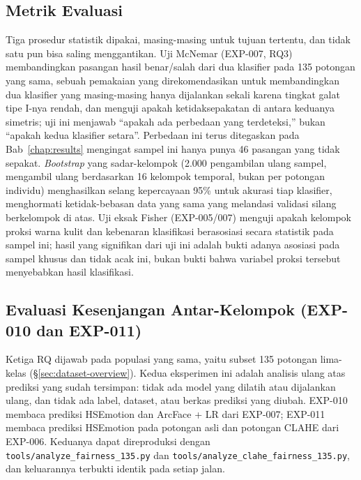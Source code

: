 \subsection{Metrik Evaluasi}
\label{sec:metrics}

Tiga prosedur statistik dipakai, masing-masing untuk tujuan tertentu, dan tidak satu pun bisa saling menggantikan. Uji McNemar \citep{mcnemar1947note} (EXP-007, RQ3) membandingkan pasangan hasil benar/salah dari dua klasifier pada 135 potongan yang sama, sebuah pemakaian yang direkomendasikan \citet{dietterich1998approximate} untuk membandingkan dua klasifier yang masing-masing hanya dijalankan sekali karena tingkat galat tipe I-nya rendah, dan menguji apakah ketidaksepakatan di antara keduanya simetris; uji ini menjawab ``apakah ada perbedaan yang terdeteksi,'' bukan ``apakah kedua klasifier setara''. Perbedaan ini terus ditegaskan pada Bab~\ref{chap:results} mengingat sampel ini hanya punya 46 pasangan yang tidak sepakat. \textit{Bootstrap} yang sadar-kelompok (2.000 pengambilan ulang sampel, mengambil ulang berdasarkan 16 kelompok temporal, bukan per potongan individu) menghasilkan selang kepercayaan 95\% untuk akurasi tiap klasifier, menghormati ketidak-bebasan data yang sama yang melandasi validasi silang berkelompok di atas. Uji eksak Fisher (EXP-005/007) menguji apakah kelompok proksi warna kulit dan kebenaran klasifikasi berasosiasi secara statistik pada sampel ini; hasil yang signifikan dari uji ini adalah bukti adanya asosiasi pada sampel khusus dan tidak acak ini, bukan bukti bahwa variabel proksi tersebut menyebabkan hasil klasifikasi.

\subsection{Evaluasi Kesenjangan Antar-Kelompok (EXP-010 dan EXP-011)}
\label{sec:fairness-methods}

Ketiga RQ dijawab pada populasi yang sama, yaitu subset 135 potongan lima-kelas (\S\ref{sec:dataset-overview}). Kedua eksperimen ini adalah analisis ulang atas prediksi yang sudah tersimpan: tidak ada model yang dilatih atau dijalankan ulang, dan tidak ada label, dataset, atau berkas prediksi yang diubah. EXP-010 membaca prediksi HSEmotion dan ArcFace + LR\label{abbr:LR} dari EXP-007; EXP-011 membaca prediksi HSEmotion pada potongan asli dan potongan CLAHE dari EXP-006. Keduanya dapat direproduksi dengan \texttt{tools/\allowbreak analyze\_fairness\_135.py} dan \texttt{tools/\allowbreak analyze\_clahe\_fairness\_135.py}, dan keluarannya terbukti identik pada setiap jalan.


